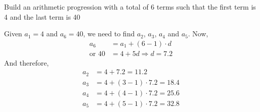 
%
%
%
%
% 
% 

\question[3] Build an arithmetic progression with a total of 6 terms such
that the first term is 4 and the last term is 40


\ifprintanswers
\fi 

\begin{solution}[\halfpage]
  Given $a_1 = 4$ and $a_6 = 40$, we need to find $a_2$, $a_3$, $a_4$ and $a_5$. Now,
  \begin{align}
     a_6 &= a_1 + (6-1)\cdot d \\
     \text{or } 40 &= 4 + 5d \Rightarrow d = 7.2
  \end{align}
  And therefore, 
  \begin{align}
     a_2 &= 4 + 7.2 = 11.2 \\
     a_3 &= 4 + (3-1)\cdot 7.2 = 18.4 \\
     a_4 &= 4 + (4-1)\cdot 7.2 = 25.6 \\
     a_5 &= 4 + (5-1)\cdot 7.2 = 32.8
  \end{align}

\end{solution}
